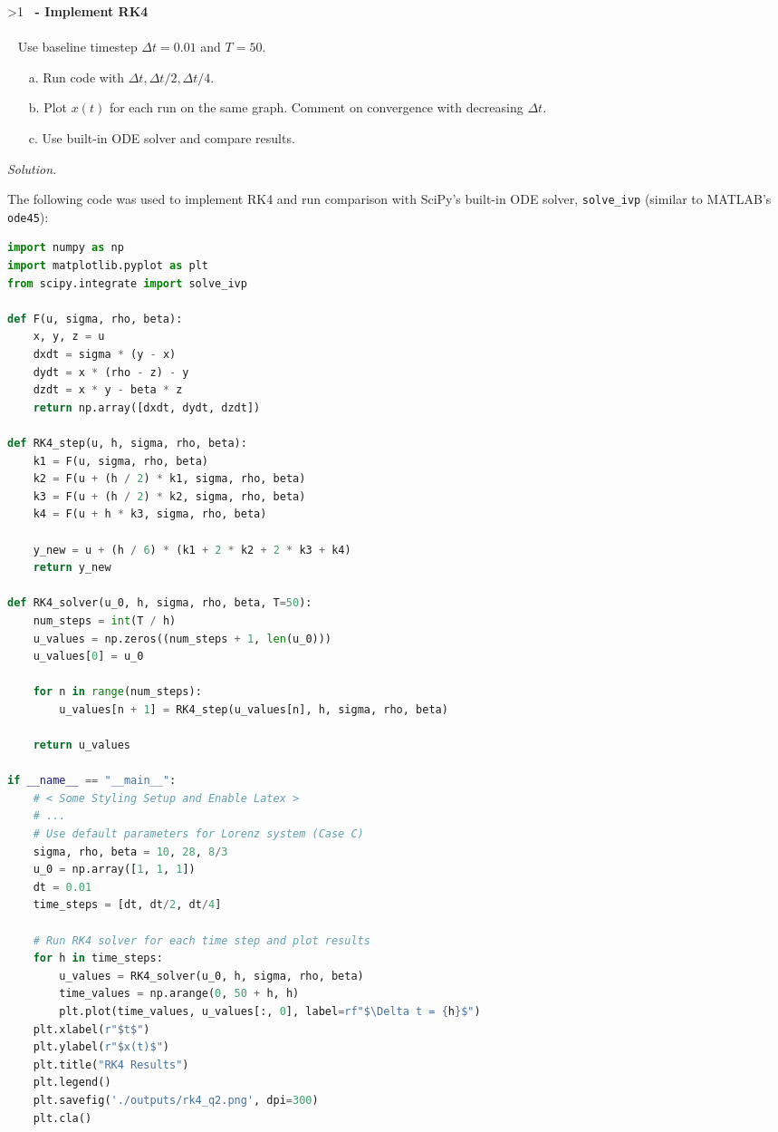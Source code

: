 \documentclass[12pt]{article}
\newcounter{question}
\newcounter{subquest}
\newcommand{\question}[1]{
    \stepcounter{question} 
    \ifnum\value{question}>1 \fi
    \vspace{.5em}
    \textbf{ \Large\thequestion \ - #1} \\
    \vspace{.5em} 
    \hrulefill \\
    \setcounter{subquest}{0}\ }
\newcommand{\solution}
    {\hrulefill \par\vspace{0.5em}\noindent\emph{Solution.}\ }
    {\par\vspace{1em}}
\begin{document}
\setcounter{page}{2}
\question{Implement RK4}
Use baseline timestep $\Delta t = 0.01$ and $T=50$.
\begin{itemize}
    \item[a.] Run code with $\Delta t, \Delta t/2, \Delta t/4$.
    \item[b.] Plot $x(t)$ for each run on the same graph. Comment on convergence with decreasing $\Delta t$.
    \item[c.] Use built-in ODE solver and compare results.  
\end{itemize}

\solution

The following code was used to implement RK4 and run comparison with SciPy's built-in ODE solver, \texttt{solve\_ivp} (similar to MATLAB's \texttt{ode45}):

\begin{lstlisting}[language=Python, caption={Question 2 Python}]
import numpy as np
import matplotlib.pyplot as plt
from scipy.integrate import solve_ivp

def F(u, sigma, rho, beta):
    x, y, z = u
    dxdt = sigma * (y - x)
    dydt = x * (rho - z) - y
    dzdt = x * y - beta * z
    return np.array([dxdt, dydt, dzdt])

def RK4_step(u, h, sigma, rho, beta):
    k1 = F(u, sigma, rho, beta)
    k2 = F(u + (h / 2) * k1, sigma, rho, beta)
    k3 = F(u + (h / 2) * k2, sigma, rho, beta)
    k4 = F(u + h * k3, sigma, rho, beta)

    y_new = u + (h / 6) * (k1 + 2 * k2 + 2 * k3 + k4)
    return y_new
    
def RK4_solver(u_0, h, sigma, rho, beta, T=50):
    num_steps = int(T / h)
    u_values = np.zeros((num_steps + 1, len(u_0)))
    u_values[0] = u_0

    for n in range(num_steps):
        u_values[n + 1] = RK4_step(u_values[n], h, sigma, rho, beta)

    return u_values

if __name__ == "__main__":
    # < Some Styling Setup and Enable Latex >
    # ...
    # Use default parameters for Lorenz system (Case C)
    sigma, rho, beta = 10, 28, 8/3
    u_0 = np.array([1, 1, 1])
    dt = 0.01
    time_steps = [dt, dt/2, dt/4]
    
    # Run RK4 solver for each time step and plot results
    for h in time_steps:
        u_values = RK4_solver(u_0, h, sigma, rho, beta)
        time_values = np.arange(0, 50 + h, h)
        plt.plot(time_values, u_values[:, 0], label=rf"$\Delta t = {h}$")
    plt.xlabel(r"$t$")
    plt.ylabel(r"$x(t)$")
    plt.title("RK4 Results")
    plt.legend()
    plt.savefig('./outputs/rk4_q2.png', dpi=300)
    plt.cla()
    

\end{lstlisting}
\end{document}
